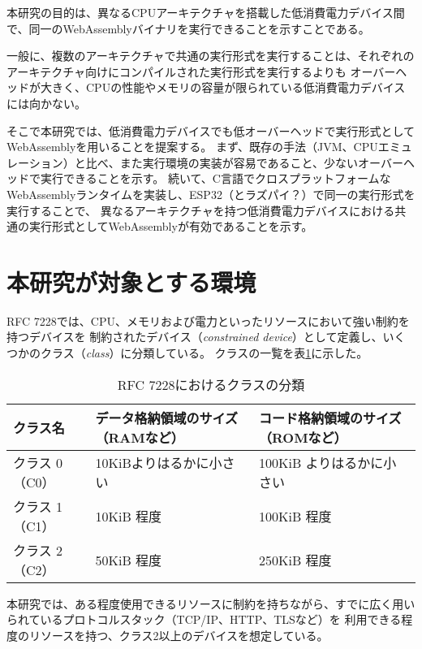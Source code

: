 本研究の目的は、異なるCPUアーキテクチャを搭載した低消費電力デバイス間で、同一のWebAssemblyバイナリを実行できることを示すことである。

一般に、複数のアーキテクチャで共通の実行形式を実行することは、それぞれのアーキテクチャ向けにコンパイルされた実行形式を実行するよりも
オーバーヘッドが大きく、CPUの性能やメモリの容量が限られている低消費電力デバイスには向かない。

そこで本研究では、低消費電力デバイスでも低オーバーヘッドで実行形式としてWebAssemblyを用いることを提案する。
まず、既存の手法（JVM、CPUエミュレーション）と比べ、また実行環境の実装が容易であること、少ないオーバーヘッドで実行できることを示す。
続いて、C言語でクロスプラットフォームなWebAssemblyランタイムを実装し、ESP32（とラズパイ？）で同一の実行形式を実行することで、
異なるアーキテクチャを持つ低消費電力デバイスにおける共通の実行形式としてWebAssemblyが有効であることを示す。

\section{本研究が対象とする環境}

RFC 7228\cite{rfc7228}では、CPU、メモリおよび電力といったリソースにおいて強い制約を持つデバイスを
制約されたデバイス（{\it constrained device}）として定義し、いくつかのクラス（{\it class}）に分類している。
クラスの一覧を表\ref{tb:rfc7228}に示した。

\begin{table}[htbp]
  \caption{RFC 7228におけるクラスの分類}
  \label{tb:rfc7228}
  \begin{center}
    \begin{tabular}{|l|l|l|}
      \hline
      クラス名 & データ格納領域のサイズ（RAMなど） & コード格納領域のサイズ（ROMなど） \\ \hline
      クラス 0（C0） & 10KiBよりはるかに小さい & 100KiB よりはるかに小さい \\ \hline
      クラス 1（C1） & 10KiB 程度 & 100KiB 程度 \\ \hline
      クラス 2（C2） & 50KiB 程度 & 250KiB 程度 \\ \hline
    \end{tabular}
  \end{center}
\end{table}

本研究では、ある程度使用できるリソースに制約を持ちながら、すでに広く用いられているプロトコルスタック（TCP/IP、HTTP、TLSなど）を
利用できる程度のリソースを持つ、クラス2以上のデバイスを想定している。

